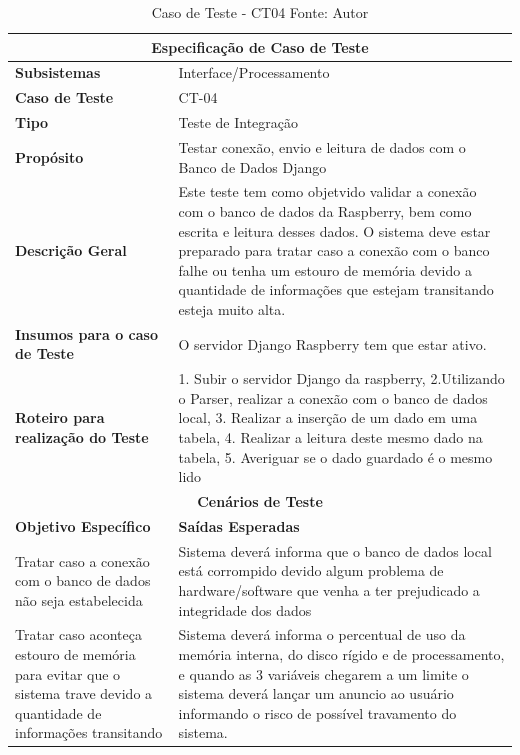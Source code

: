\begin{table}[H]
    \begin{center}
        \begin{tabular}{|p{5cm}|p{12cm}|}
            \hline
            \multicolumn{2}{|c|}{\textbf{Especificação de Caso de Teste}} \\ \hline
                \textbf{Subsistemas}                               & Interface/Processamento\\ \hline
                \textbf{Caso de Teste}                             & CT-04 \\ \hline
                \textbf{Tipo}                                             & Teste de Integração \\ \hline
                \textbf{Propósito}                                     & Testar conexão, envio e leitura de dados com o Banco de Dados Django \\ \hline
                \textbf{Descrição Geral}                           & Este teste tem como objetvido validar a conexão com o banco de dados da Raspberry, bem como escrita e leitura desses dados. O sistema deve estar preparado para tratar caso a conexão com o banco falhe ou tenha um estouro de memória devido a quantidade de informações que estejam transitando esteja muito alta. \\ \hline
                \textbf{Insumos para o caso de Teste}    & O servidor Django Raspberry tem que estar ativo. \\ \hline
                \textbf{Roteiro para realização do Teste}&  1. Subir o servidor Django da raspberry, 2.Utilizando o Parser, realizar a conexão com o banco de dados local, 3. Realizar a inserção de um dado em uma tabela, 4. Realizar a leitura deste mesmo dado na tabela, 5. Averiguar se o dado guardado é o mesmo lido  \\ \hline
            \multicolumn{2}{|c|}{\textbf{Cenários de Teste}} \\ \hline
                \textbf{Objetivo Específico}                      & \textbf{Saídas Esperadas} \\ \hline
                Tratar caso a conexão com o banco de dados não seja estabelecida & Sistema deverá informa que o banco de dados local está corrompido devido algum problema de hardware/software que venha a ter prejudicado a integridade dos dados \\ \hline
                Tratar caso aconteça estouro de memória para evitar que o sistema trave devido a quantidade de informações transitando & Sistema deverá informa o percentual de uso da memória interna, do disco rígido e de processamento, e quando as 3 variáveis chegarem a um limite o sistema deverá lançar um anuncio ao usuário informando o risco de possível travamento do sistema. \\ \hline
        \end{tabular}
    \end{center}
    \caption[Caso de Teste - CT04]{Caso de Teste - CT04
    \protect Fonte: Autor}
    \label{CT-04}
\end{table}

